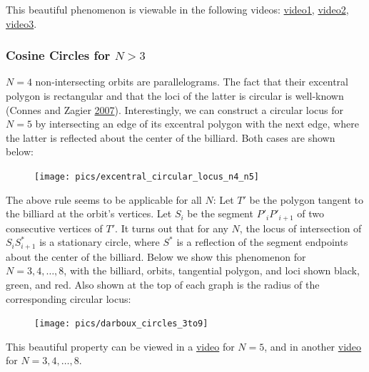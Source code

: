 \documentclass[]{article}
\begin{document}
This beautiful phenomenon is viewable in the following videos: \href{https://youtu.be/hCQIT6_XhaQ}{video1}, \href{https://youtu.be/CrOSI8d8qDc}{video2}, \href{https://youtu.be/ACinCf-D_Ok}{video3}.

\hypertarget{cosine-circles-for-n3}{%
\subsubsection{\texorpdfstring{Cosine Circles for \(N>3\)}{Cosine Circles for N\textgreater{}3}}\label{cosine-circles-for-n3}}

\(N=4\) non-intersecting orbits are parallelograms. The fact that their excentral polygon is rectangular and that the loci of the latter is circular is well-known (Connes and Zagier \protect\hyperlink{ref-connes07}{2007}). Interestingly, we can construct a circular locus for \(N=5\) by intersecting an edge of its excentral polygon with the next edge, where the latter is reflected about the center of the billiard. Both cases are shown below:

\begin{figure}[H]

{\centering \texttt{[image: pics/excentral\_circular\_locus\_n4\_n5]} 

}

\end{figure}

The above rule seems to be applicable for all \(N\): Let \(T'\) be the polygon tangent to the billiard at the orbit's vertices. Let \(S_i\) be the segment \(P'_iP'_{i+1}\) of two consecutive vertices of \(T'\). It turns out that for any \(N\), the locus of intersection of \(S_iS^*_{i+1}\) is a stationary circle, where \(S^*\) is a reflection of the segment endpoints about the center of the billiard. Below we show this phenomenon for \(N=3,4,\ldots,8\), with the billiard, orbits, tangential polygon, and loci shown black, green, and red. Also shown at the top of each graph is the radius of the corresponding circular locus:

\begin{figure}[H]

{\centering \texttt{[image: pics/darboux\_circles\_3to9]} 

}

\end{figure}

This beautiful property can be viewed in a \href{https://youtu.be/dINE4aH1cvk}{video} for \(N=5\), and in another \href{https://youtu.be/EFeINGIDFrg}{video} for \(N=3,4,\ldots,8\).
\end{document}
